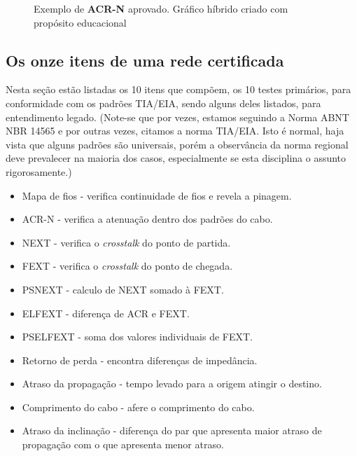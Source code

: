 \documentclass[	DIV=calc,%
							paper=a4,%
							fontsize=12pt,%
							onecolumn]{scrartcl}	 					%
\begin{document}
\begin{figure}[H]
	\noindent{}
	\caption{Exemplo de \textbf{ACR-N} aprovado. Gráfico híbrido criado com propósito educacional \cite{acr}}
	\label{fig5}
\end{figure}


\subsection{Os onze itens de uma rede certificada}
Nesta seção estão listadas os 10 itens que compõem, os 10 testes primários, para conformidade com os padrões TIA/EIA, sendo alguns deles listados, para entendimento legado. (Note-se que por vezes, estamos seguindo a Norma ABNT NBR 14565 e por outras vezes, citamos a norma TIA/EIA. Isto é normal, haja vista que alguns padrões são universais, porém a observância da norma regional deve prevalecer na maioria dos casos, especialmente se esta disciplina o assunto rigorosamente.)

\begin{itemize}
\item Mapa de fios - verifica continuidade de fios e revela a pinagem. 
\item ACR-N - verifica a atenuação dentro dos padrões do cabo.
\item NEXT - verifica o \textit{crosstalk} do ponto de partida.
\item FEXT - verifica o \textit{crosstalk} do ponto de chegada.
\item PSNEXT - calculo de NEXT somado à FEXT.
\item ELFEXT - diferença de ACR e FEXT.
\item PSELFEXT - soma dos valores individuais de FEXT.
\item Retorno de perda - encontra diferenças de impedância.
\item Atraso da propagação - tempo levado para a origem atingir o destino.
\item Comprimento do cabo - afere o comprimento do cabo.
\item Atraso da inclinação - diferença do par que apresenta maior atraso de propagação com o que apresenta menor atraso.
\end{itemize}
\end{document}
